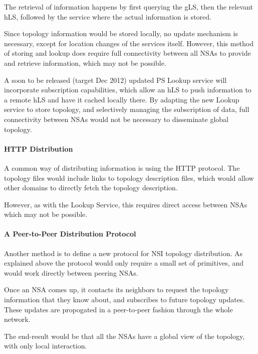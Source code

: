 \documentclass[12pt]{article}  %
\begin{document}
The retrieval of information happens by first querying 
the gLS, then the relevant hLS, followed by the service where the actual information 
is stored.\label{h.tjjrmby8htjk}


Since topology information would be stored locally, 
no update mechanism is necessary, except for location changes of the services itself. 
However, this method of storing and lookup does require full connectivity between 
all NSAs to provide and retrieve information, which may not be possible.


 A soon to be released (target Dec 2012) updated PS Lookup service 
will incorporate subscription capabilities, which allow an hLS to push information 
to a remote hLS and have it cached locally there. By adapting the new Lookup service 
to store topology, and selectively managing the subscription of data, full connectivity 
between NSAs would not be necessary to disseminate global topology.


\paragraph{HTTP Distribution}

 A common way of distributing information is using the HTTP protocol. 
The topology files would include links to topology description files, which would 
allow other domains to directly fetch the topology description.\label{h.efkcsmt7dwgr}


However, as with the Lookup Service, this requires 
direct access between NSAs which may not be possible.\label{h.mbgns4xsvbt4}


\paragraph{A Peer-to-Peer Distribution Protocol}

 Another method is to define a new protocol for NSI topology distribution. 
As explained above the protocol would only require a small set of primitives, and 
would work directly between peering NSAs.\label{h.jo1it2zr3py}


Once an NSA comes up, it contacts its neighbors to 
request the topology information that they know about, and subscribes to future 
topology updates. These updates are propogated in a peer-to-peer fashion through 
the whole network.\label{h.3qkmh8hazvti}


The end-result would be that all the NSAs have a 
global view of the topology, with only local interaction.\label{h.40nvr2if8zj}
\end{document}
